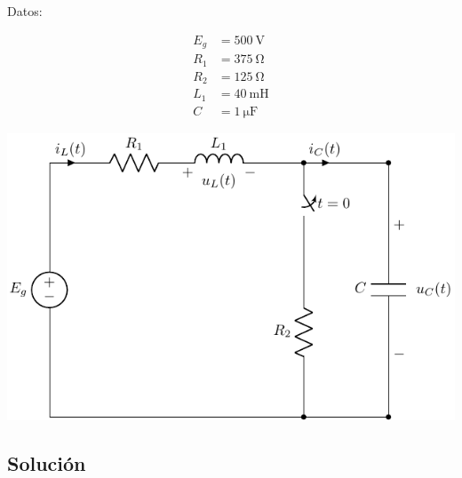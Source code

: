 \begin{minipage}{0.3\linewidth}
  Datos:


  \begin{align*}
    E_g &= \SI{500}{\volt}\\   
    R_{1} &= \SI{375}{\ohm}\\ 
    R_{2} &=\SI{125}{\ohm}\\ 
    L_1 &= \SI{40}{\milli\henry}\\ 
    C &= \SI{1}{\micro\farad}
  \end{align*}
\end{minipage}
\begin{minipage}{0.7\linewidth}
  \includegraphics{figuras/E1_RLC.pdf}
\end{minipage}

\subsection*{Solución}

